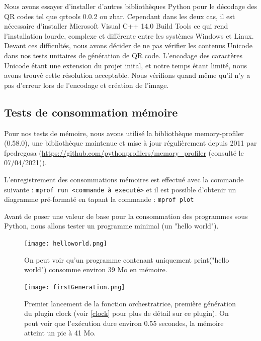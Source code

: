 \documentclass[a4paper,12pt]{article}
\begin{document}
\noindent Nous avons essayer d'installer d'autres bibliothèques Python pour le décodage des QR codes tel que qrtools 0.0.2 ou zbar. Cependant dans les deux cas, il est nécessaire d'installer Microsoft Visual C++ 14.0 Build Tools ce qui rend l'installation lourde, complexe et différente entre les systèmes Windows et Linux.\\

\noindent Devant ces difficultés, nous avons décider de ne pas vérifier les contenus Unicode dans nos tests unitaires de génération de QR code. L'encodage des caractères Unicode étant une extension du projet inital, et notre temps étant limité, nous avons trouvé cette résolution acceptable. Nous vérifions quand même qu'il n'y a pas d'erreur lors de l'encodage et création de l'image.

\subsection{Tests de consommation mémoire}


\noindent Pour nos tests de mémoire, nous avons utilisé la bibliothèque memory-profiler (0.58.0), une bibliothèque maintenue et mise à jour régulièrement depuis 2011 par fpedregosa (\url{https://github.com/pythonprofilers/memory_profiler} (consulté le 07/04/2021)).

\noindent L'enregistrement des consommations mémoires est effectué avec la commande suivante : \verb|mprof run <commande à executé>| et il est possible d'obtenir un diagramme pré-formaté en tapant la commande : \verb|mprof plot|

\noindent Avant de poser une valeur de base pour la consommation des programmes sous Python, nous allons tester un programme minimal (un "hello world").

\begin{figure}[H]
\begin{center}
  \texttt{[image: helloworld.png]}
  \caption{On peut voir qu'un programme contenant uniquement print("hello world") consomme environ 39 Mo en mémoire.}
\end{center}
\end{figure}


\begin{figure}[H]
\begin{center}
  \texttt{[image: firstGeneration.png]}
  \caption{Premier lancement de la fonction orchestratrice, première génération du plugin clock (voir \ref{clock} pour plus de détail sur ce plugin). On peut voir que l'exécution dure environ 0.55 secondes, la mémoire atteint un pic à 41 Mo.}
\end{center}
\end{figure}
\end{document}

